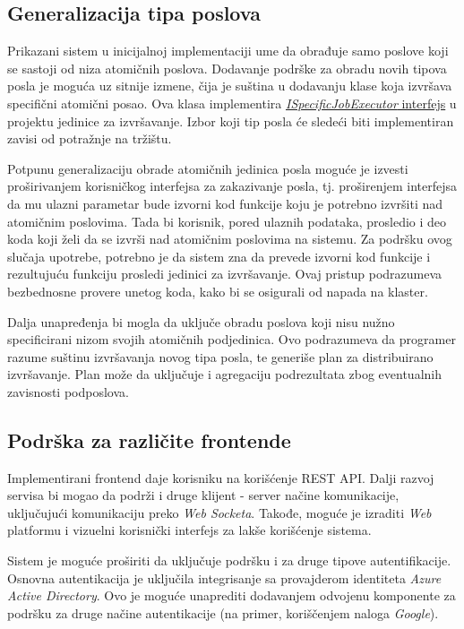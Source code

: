 \documentclass[12pt,oneside]{memoir}
\begin{document}
\subsection{Generalizacija tipa poslova}

Prikazani sistem u inicijalnoj implementaciji ume da obrađuje samo poslove koji se sastoji od niza atomičnih poslova. Dodavanje podrške za obradu novih tipova posla je moguća uz sitnije izmene, čija je suština u dodavanju klase koja izvršava specifični atomični posao. Ova klasa implementira \href{https://github.com/milana-kovacevic/DistributedComputationSystem/blob/main/src/ComputeNode/Executors/ISpecificJobExecutor.cs}{\emph{ISpecificJobExecutor} interfejs} u projektu jedinice za izvršavanje. Izbor koji tip posla će sledeći biti implementiran zavisi od potražnje na tržištu.

Potpunu generalizaciju obrade atomičnih jedinica posla moguće je izvesti proširivanjem korisničkog interfejsa za zakazivanje posla, tj. proširenjem interfejsa da mu ulazni parametar bude izvorni kod funkcije koju je potrebno izvršiti nad atomičnim poslovima. Tada bi korisnik, pored ulaznih podataka, prosledio i deo koda koji želi da se izvrši nad atomičnim poslovima na sistemu. Za podršku ovog slučaja upotrebe, potrebno je da sistem zna da prevede izvorni kod funkcije i rezultujuću funkciju prosledi jedinici za izvršavanje. Ovaj pristup podrazumeva bezbednosne provere unetog koda, kako bi se osigurali od napada na klaster.

Dalja unapređenja bi mogla da uključe obradu poslova koji nisu nužno specificirani nizom svojih atomičnih podjedinica. Ovo podrazumeva da programer razume suštinu izvršavanja novog tipa posla, te generiše plan za distribuirano izvršavanje. Plan može da uključuje i agregaciju podrezultata zbog eventualnih zavisnosti podposlova.


\subsection{Podrška za različite frontende}

Implementirani frontend daje korisniku na korišćenje REST API. Dalji razvoj servisa bi mogao da podrži i druge klijent - server načine komunikacije, uključujući komunikaciju preko \emph{Web Socketa}. Takođe, moguće je izraditi \emph{Web} platformu i vizuelni korisnički interfejs za lakše korišćenje sistema.

Sistem je moguće proširiti da uključuje podršku i za druge tipove autentifikacije. Osnovna autentikacija je uključila integrisanje sa provajderom identiteta \emph{Azure Active Directory}. Ovo je moguće unaprediti dodavanjem odvojenu komponente za podršku za druge načine autentikacije (na primer, koriščenjem naloga \emph{Google}).
\end{document}
